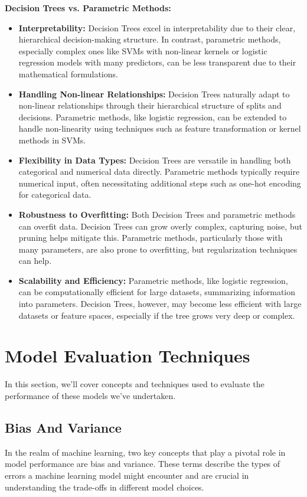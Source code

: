 \documentclass[letterpaper,10pt]{article}
\begin{document}
\textbf{Decision Trees vs. Parametric Methods:}
\begin{itemize}
\item \textbf{Interpretability:} Decision Trees excel in interpretability due to their clear, hierarchical decision-making structure. In contrast, parametric methods, especially complex ones like SVMs with non-linear kernels or logistic regression models with many predictors, can be less transparent due to their mathematical formulations.
\item \textbf{Handling Non-linear Relationships:} Decision Trees naturally adapt to non-linear relationships through their hierarchical structure of splits and decisions. Parametric methods, like logistic regression, can be extended to handle non-linearity using techniques such as feature transformation or kernel methods in SVMs.

\item \textbf{Flexibility in Data Types:} Decision Trees are versatile in handling both categorical and numerical data directly. Parametric methods typically require numerical input, often necessitating additional steps such as one-hot encoding for categorical data.

\item \textbf{Robustness to Overfitting:} Both Decision Trees and parametric methods can overfit data. Decision Trees can grow overly complex, capturing noise, but pruning helps mitigate this. Parametric methods, particularly those with many parameters, are also prone to overfitting, but regularization techniques can help.

\item \textbf{Scalability and Efficiency:} Parametric methods, like logistic regression, can be computationally efficient for large datasets, summarizing information into parameters. Decision Trees, however, may become less efficient with large datasets or feature spaces, especially if the tree grows very deep or complex.
\end{itemize}




\newpage
\section{Model Evaluation Techniques}
In this section, we'll cover concepts and techniques used to evaluate the performance of these models we've undertaken.
\subsection{Bias And Variance}
In the realm of machine learning, two key concepts that play a pivotal role in model performance are bias and variance. These terms describe the types of errors a machine learning model might encounter and are crucial in understanding the trade-offs in different model choices. \par
\end{document}
